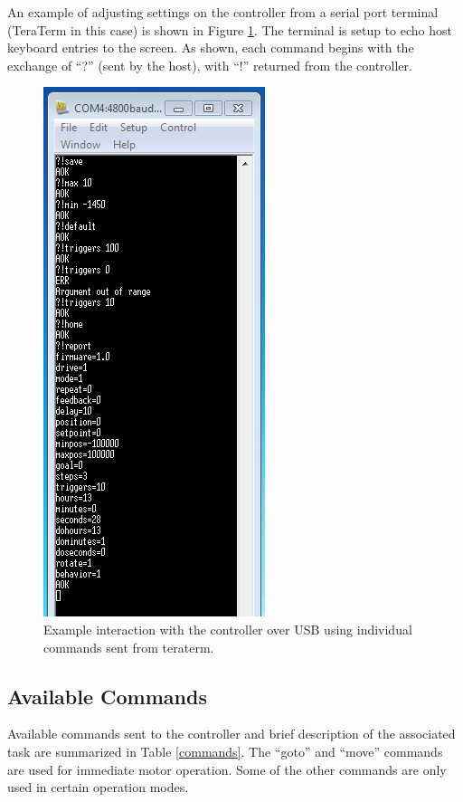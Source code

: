 \documentclass[10pt]{article}
\begin{document}
An example of adjusting settings on the controller from a serial port terminal (TeraTerm in this case) is shown in Figure \ref{Serial_Example}.  The terminal is setup to echo host keyboard entries to the screen.  As shown, each command begins with the exchange of ``?'' (sent by the host), with ``!'' returned from the controller.    

\begin{figure}[!htb]
\centering
\includegraphics[width=0.5\linewidth]{Figures/Terminal.png}
\caption{Example interaction with the controller over USB using individual commands sent from teraterm.}
\label{Serial_Example}
\end{figure} 

\FloatBarrier
\subsection{Available Commands}

Available commands sent to the controller and brief description of the associated task are summarized in Table \ref{commands}.  The ``goto'' and ``move'' commands are used for immediate motor operation.  Some of the other commands are only used in certain operation modes.        
\end{document}

